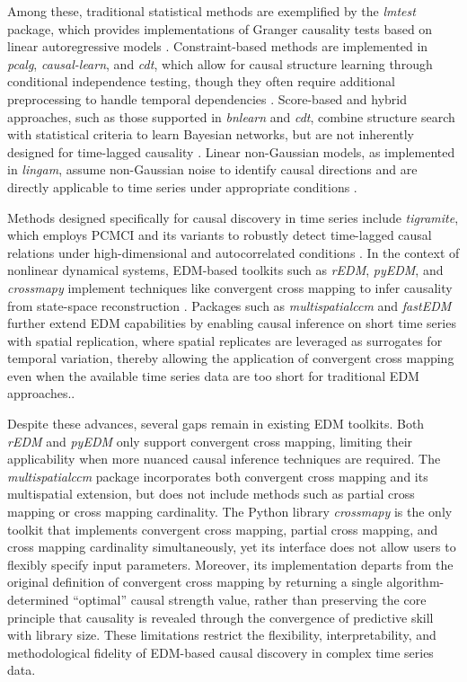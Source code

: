 \documentclass[authoryear,preprint,review,12pt]{elsarticle}
\begin{document}
Among these, traditional statistical methods are exemplified by the \textit{lmtest} package, which provides implementations of Granger causality tests based on linear autoregressive models \citep{lmtest}. Constraint-based methods are implemented in \textit{pcalg}, \textit{causal-learn}, and \textit{cdt}, which allow for causal structure learning through conditional independence testing, though they often require additional preprocessing to handle temporal dependencies \citep{pcalg,causal-learn,cdt}. Score-based and hybrid approaches, such as those supported in \textit{bnlearn} and \textit{cdt}, combine structure search with statistical criteria to learn Bayesian networks, but are not inherently designed for time-lagged causality \citep{bnlearn,cdt}. Linear non-Gaussian models, as implemented in \textit{lingam}, assume non-Gaussian noise to identify causal directions and are directly applicable to time series under appropriate conditions \citep{lingam}.

Methods designed specifically for causal discovery in time series include \textit{tigramite}, which employs PCMCI and its variants to robustly detect time-lagged causal relations under high-dimensional and autocorrelated conditions \citep{runge2019pcmci,runge2023cits}. In the context of nonlinear dynamical systems, EDM-based toolkits such as \textit{rEDM}, \textit{pyEDM}, and \textit{crossmapy} implement techniques like convergent cross mapping to infer causality from state-space reconstruction \citep{sugihara2012ccm, tao2023cmc}. Packages such as \textit{multispatialccm} and \textit{fastEDM} further extend EDM capabilities by enabling causal inference on short time series with spatial replication, where spatial replicates are leveraged as surrogates for temporal variation, thereby allowing the application of convergent cross mapping even when the available time series data are too short for traditional EDM approaches.\citep{clark2015multispatialccm,fastEDM}.

Despite these advances, several gaps remain in existing EDM toolkits. Both \textit{rEDM} and \textit{pyEDM} only support convergent cross mapping, limiting their applicability when more nuanced causal inference techniques are required. The \textit{multispatialccm} package incorporates both convergent cross mapping and its multispatial extension, but does not include methods such as partial cross mapping or cross mapping cardinality. The Python library \textit{crossmapy} is the only toolkit that implements convergent cross mapping, partial cross mapping, and cross mapping cardinality simultaneously, yet its interface does not allow users to flexibly specify input parameters. Moreover, its implementation departs from the original definition of convergent cross mapping by returning a single algorithm-determined “optimal” causal strength value, rather than preserving the core principle that causality is revealed through the convergence of predictive skill with library size. These limitations restrict the flexibility, interpretability, and methodological fidelity of EDM-based causal discovery in complex time series data.
\end{document}
